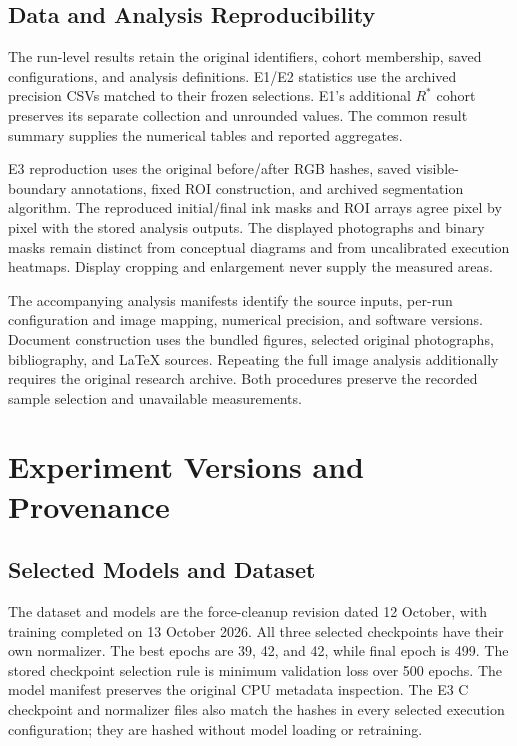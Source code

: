 \section{Data and Analysis Reproducibility}
The run-level results retain the original identifiers, cohort membership, saved configurations, and analysis definitions. E1/E2 statistics use the archived precision CSVs matched to their frozen selections. E1's additional \(R^{*}\) cohort preserves its separate collection and unrounded values. The common result summary supplies the numerical tables and reported aggregates.

E3 reproduction uses the original before/after RGB hashes, saved visible-boundary annotations, fixed ROI construction, and archived segmentation algorithm. The reproduced initial/final ink masks and ROI arrays agree pixel by pixel with the stored analysis outputs. The displayed photographs and binary masks remain distinct from conceptual diagrams and from uncalibrated execution heatmaps. Display cropping and enlargement never supply the measured areas.

The accompanying analysis manifests identify the source inputs, per-run configuration and image mapping, numerical precision, and software versions. Document construction uses the bundled figures, selected original photographs, bibliography, and LaTeX sources. Repeating the full image analysis additionally requires the original research archive. Both procedures preserve the recorded sample selection and unavailable measurements.

\chapter{Experiment Versions and Provenance}
\label{app:provenance}

\section{Selected Models and Dataset}
The dataset and models are the force-cleanup revision dated 12 October, with training completed on 13 October 2026. All three selected checkpoints have their own normalizer. The best epochs are 39, 42, and 42, while final epoch is 499. The stored checkpoint selection rule is minimum validation loss over 500 epochs. The model manifest preserves the original CPU metadata inspection. The E3 C checkpoint and normalizer files also match the hashes in every selected execution configuration; they are hashed without model loading or retraining.

